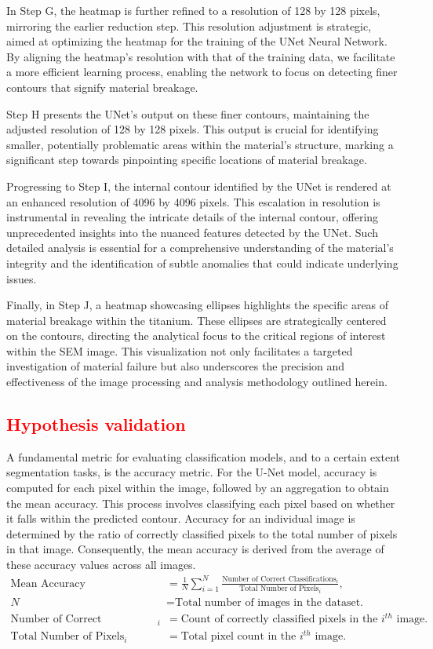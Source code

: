 \documentclass[preprint,12pt]{elsarticle}
\begin{document}
In Step G, the heatmap is further refined to a resolution of 128 by 128 pixels, mirroring the earlier reduction step. This resolution adjustment is strategic, aimed at optimizing the heatmap for the training of the UNet Neural Network. By aligning the heatmap's resolution with that of the training data, we facilitate a more efficient learning process, enabling the network to focus on detecting finer contours that signify material breakage.


Step H presents the UNet's output on these finer contours, maintaining the adjusted resolution of 128 by 128 pixels. This output is crucial for identifying smaller, potentially problematic areas within the material's structure, marking a significant step towards pinpointing specific locations of material breakage.


Progressing to Step I, the internal contour identified by the UNet is rendered at an enhanced resolution of 4096 by 4096 pixels. This escalation in resolution is instrumental in revealing the intricate details of the internal contour, offering unprecedented insights into the nuanced features detected by the UNet. Such detailed analysis is essential for a comprehensive understanding of the material's integrity and the identification of subtle anomalies that could indicate underlying issues.


Finally, in Step J, a heatmap showcasing ellipses highlights the specific areas of material breakage within the titanium. These ellipses are strategically centered on the contours, directing the analytical focus to the critical regions of interest within the SEM image. This visualization not only facilitates a targeted investigation of material failure but also underscores the precision and effectiveness of the image processing and analysis methodology outlined herein.
\clearpage

\subsection{\textcolor{red}{Hypothesis validation}}
A fundamental metric for evaluating classification models, and to a certain extent segmentation tasks, is the accuracy metric. For the U-Net model, accuracy is computed for each pixel within the image, followed by an aggregation to obtain the mean accuracy. This process involves classifying each pixel based on whether it falls within the predicted contour. Accuracy for an individual image is determined by the ratio of correctly classified pixels to the total number of pixels in that image. Consequently, the mean accuracy is derived from the average of these accuracy values across all images.
\begin{align*}
\text{Mean Accuracy} & = \frac{1}{N} \sum_{i=1}^{N} \frac{\text{Number of Correct Classifications}_i}{\text{Total Number of Pixels}_i}, \\
N & = \text{Total number of images in the dataset.} \\
\text{Number of Correct Classifications}_i & = \text{Count of correctly classified pixels in the $i^{th}$ image.} \\
\text{Total Number of Pixels}_i & = \text{Total pixel count in the $i^{th}$ image.}
\end{align*}
\end{document}
